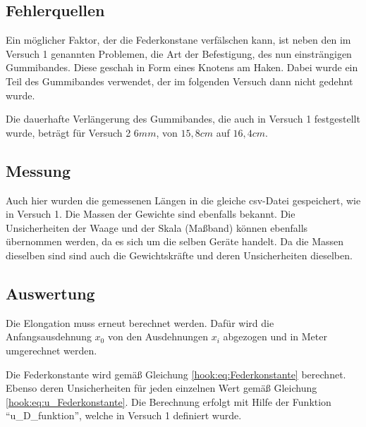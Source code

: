 \documentclass[class=article, crop=false]{standalone}
\begin{document}
\hypertarget{fehlerquellen-1}{%
\subsection{Fehlerquellen}\label{fehlerquellen-1}}

Ein möglicher Faktor, der die Federkonstane verfälschen kann, ist neben
den im Versuch 1 genannten Problemen, die Art der Befestigung, des nun
einsträngigen Gummibandes. Diese geschah in Form eines Knotens am Haken.
Dabei wurde ein Teil des Gummibandes verwendet, der im folgenden Versuch
dann nicht gedehnt wurde.

Die dauerhafte Verlängerung des Gummibandes, die auch in Versuch 1
festgestellt wurde, beträgt für Versuch 2 \(6mm\), von \(15,8cm\) auf
\(16,4cm\).

\hypertarget{messung-1}{%
\subsection{Messung}\label{messung-1}}

Auch hier wurden die gemessenen Längen in die gleiche csv-Datei
gespeichert, wie in Versuch 1. Die Massen der Gewichte sind ebenfalls
bekannt. Die Unsicherheiten der Waage und der Skala (Maßband) können
ebenfalls übernommen werden, da es sich um die selben Geräte handelt. Da
die Massen dieselben sind sind auch die Gewichtskräfte und deren
Unsicherheiten dieselben.

\hypertarget{auswertung}{%
\subsection{Auswertung}\label{auswertung}}

Die Elongation muss erneut berechnet werden. Dafür wird die
Anfangsausdehnung \(x_0\) von den Ausdehnungen \(x_i\) abgezogen und in
Meter umgerechnet werden.

Die Federkonstante wird gemäß Gleichung \ref{hook:eq:Federkonstante}
berechnet. Ebenso deren Unsicherheiten für jeden einzelnen Wert gemäß
Gleichung \ref{hook:eq:u_Federkonstante}. Die Berechnung erfolgt mit
Hilfe der Funktion ``u\_D\_funktion'', welche in Versuch 1 definiert
wurde.
\end{document}
